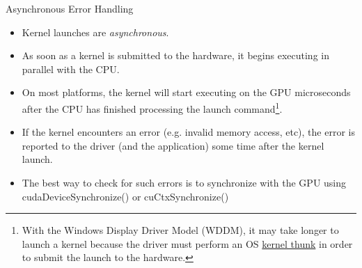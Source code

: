\documentclass[handout]{beamer}
\begin{document}

\begin{frame}{Asynchronous Error Handling}
\begin{itemize}
	\item<1->Kernel launches are \emph{asynchronous}.
	\item<1->As soon as a kernel is submitted to the hardware, it begins executing in parallel with the CPU.
	\item<1->On most platforms, the kernel will start executing on the GPU microseconds after the CPU has finished processing the launch command\footnote{With the Windows Display Driver Model (WDDM), it may take longer to launch a kernel because the driver must perform an OS \href{https://msdn.microsoft.com/en-us/library/windows/hardware/ff565689(v=vs.85).aspx}{\color{blue}kernel thunk} in order to submit the launch to the hardware.\hfill\break}.
	\item<1->If the kernel encounters an error (e.g. invalid memory access, etc), the error is reported to the driver (and the application) some time after the kernel launch.  
	\item<1->The best way to check for such errors is to synchronize with the GPU using {\selectfont cudaDeviceSynchronize()} or {\selectfont cuCtxSynchronize()}
\end{itemize}
\end{frame}
\end{document}
